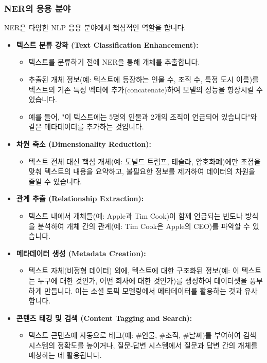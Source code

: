 \documentclass[11pt,a4paper]{article}
\theoremstyle{definition}
\begin{document}
\subsubsection*{NER의 응용 분야}
NER은 다양한 NLP 응용 분야에서 핵심적인 역할을 합니다.
\begin{itemize}
    \item \textbf{텍스트 분류 강화 (Text Classification Enhancement):}
        \begin{itemize}
            \item 텍스트를 분류하기 전에 NER을 통해 개체를 추출합니다.
            \item 추출된 개체 정보(예: 텍스트에 등장하는 인물 수, 조직 수, 특정 도시 이름)를 텍스트의 기존 특성 벡터에 추가(concatenate)하여 모델의 성능을 향상시킬 수 있습니다.
            \item 예를 들어, "이 텍스트에는 5명의 인물과 2개의 조직이 언급되어 있습니다"와 같은 메타데이터를 추가하는 것입니다.
        \end{itemize}
    \item \textbf{차원 축소 (Dimensionality Reduction):}
        \begin{itemize}
            \item 텍스트 전체 대신 핵심 개체(예: 도널드 트럼프, 테슬라, 암호화폐)에만 초점을 맞춰 텍스트의 내용을 요약하고, 불필요한 정보를 제거하여 데이터의 차원을 줄일 수 있습니다.
        \end{itemize}
    \item \textbf{관계 추출 (Relationship Extraction):}
        \begin{itemize}
            \item 텍스트 내에서 개체들(예: Apple과 Tim Cook)이 함께 언급되는 빈도나 방식을 분석하여 개체 간의 관계(예: Tim Cook은 Apple의 CEO)를 파악할 수 있습니다.
        \end{itemize}
    \item \textbf{메타데이터 생성 (Metadata Creation):}
        \begin{itemize}
            \item 텍스트 자체(비정형 데이터) 외에, 텍스트에 대한 구조화된 정보(예: 이 텍스트는 누구에 대한 것인가, 어떤 회사에 대한 것인가)를 생성하여 데이터셋을 풍부하게 만듭니다. 이는 소셜 토픽 모델링에서 메타데이터를 활용하는 것과 유사합니다.
        \end{itemize}
    \item \textbf{콘텐츠 태깅 및 검색 (Content Tagging and Search):}
        \begin{itemize}
            \item 텍스트 콘텐츠에 자동으로 태그(예: #인물, #조직, #날짜)를 부여하여 검색 시스템의 정확도를 높이거나, 질문-답변 시스템에서 질문과 답변 간의 개체를 매칭하는 데 활용됩니다.

\end{itemize}
\end{itemize}
\end{document}
